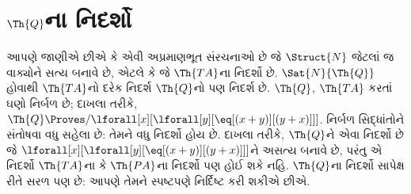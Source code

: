 \section{$\Th{Q}$ના નિદર્શો}
\label{guunit:OLP-0195}


\begin{explain}
આપણે જાણીએ છીએ કે એવી અપ્રમાણભૂત સંરચનાઓ છે જે
$\Struct{N}$ જેટલાં જ વાક્યોને સત્ય બનાવે છે, એટલે કે જે
$\Th{TA}$ના નિદર્શો છે. $\Sat{N}{\Th{Q}}$ હોવાથી $\Th{TA}$નો દરેક
નિદર્શ $\Th{Q}$નો પણ નિદર્શ છે. $\Th{Q}$, $\Th{TA}$ કરતાં ઘણો
નિર્બળ છે; દાખલા તરીકે,
$\Th{Q}\Proves/\lforall[x][\lforall[y][\eq[(x+y)][(y+x)]]]$.
નિર્બળ સિદ્ધાંતોને સંતોષવા વધુ સહેલા છે: તેમને વધુ નિદર્શો હોય છે.
દાખલા તરીકે, $\Th{Q}$ને એવા નિદર્શો છે જે
$\lforall[x][\lforall[y][\eq[(x+y)][(y+x)]]]$ને અસત્ય બનાવે છે, પરંતુ
એ નિદર્શો $\Th{TA}$ના કે $\Th{PA}$ના નિદર્શો પણ હોઈ શકે નહિ.
$\Th{Q}$ના નિદર્શો સાપેક્ષ રીતે સરળ પણ છે: આપણે તેમને સ્પષ્ટપણે
નિર્દિષ્ટ કરી શકીએ છીએ.
\end{explain}


